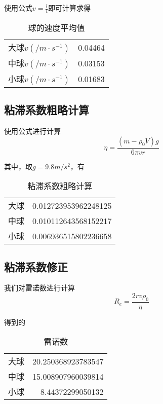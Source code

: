 \documentclass{article}
\begin{document}
使用公式$v=\frac{l}{t}$即可计算求得

\begin{table}[!hbtp]
    \begin{center}
    \caption{球的速度平均值}
    \begin{tabular}{l|r}

        \hline
        大球$v(/m\cdot s^{-1})$ & 0.04464 \\
        中球$v(/m\cdot s^{-1})$ & 0.03153 \\
        小球$v(/m\cdot s^{-1})$ & 0.01683 \\

    \end{tabular}
    \end{center}
\end{table}

\subsection{粘滞系数粗略计算}

使用公式进行计算
$$
\eta =\frac{(m-\rho _0V)g}{6\pi vr}
$$

其中，取$g=9.8m/s^{2}$，有

\begin{table}[!hbtp]
    \begin{center}
    \caption{粘滞系数粗略计算}
    \begin{tabular}{l|r}

        \hline
        大球 & 0.012723953962248125 \\
        中球 & 0.010112643568152217 \\
        小球 & 0.006936515802236658 \\

    \end{tabular}
    \end{center}
\end{table}




\subsection{粘滞系数修正}

我们对雷诺数进行计算
$$R_e=\frac{2rv\rho _0}{\eta }$$

得到的

\begin{table}[!hbtp]
    \begin{center}
    \caption{雷诺数}
    \begin{tabular}{l|r}

        \hline
        大球 & 20.250368923783547 \\
        中球 & 15.008907960039814 \\
        小球 & 8.44372299050132 \\

    \end{tabular}
    \end{center}
\end{table}
\end{document}
